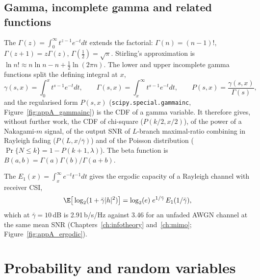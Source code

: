 \subsection{Gamma, incomplete gamma and related functions}

The  $\Gamma(z)=\int_0^\infty t^{z-1}e^{-t}dt$ extends the factorial:
$\Gamma(n)=(n-1)!$, $\Gamma(z+1)=z\Gamma(z)$, $\Gamma(\tfrac12)=\sqrt\pi$. Stirling's
approximation is $\ln n!\approx n\ln n-n+\tfrac12\ln(2\pi n)$. The lower and upper incomplete
gamma functions split the defining integral at $x$,
\begin{equation}
\gamma(s,x)=\int_0^x t^{s-1}e^{-t}dt,\qquad \Gamma(s,x)=\int_x^\infty t^{s-1}e^{-t}dt,\qquad
P(s,x)=\frac{\gamma(s,x)}{\Gamma(s)},
\label{eq:appA:incgamma}
\end{equation}
and the regularised form $P(s,x)$ (\texttt{scipy.special.gammainc}, Figure~\ref{fig:appA_gammainc})
is the CDF of a gamma variable.
It therefore gives, without further work, the CDF of chi-square ($P(k/2,x/2)$), of the power of a
Nakagami-$m$ signal, of the output SNR of $L$-branch maximal-ratio combining in Rayleigh fading
($P(L,x/\bar\gamma)$) and of the Poisson distribution ($\Pr\{N\le k\}=1-P(k+1,\lambda)$). The
beta function is $B(a,b)=\Gamma(a)\Gamma(b)/\Gamma(a+b)$.

The  $E_1(x)=\int_x^\infty e^{-t}t^{-1}dt$ gives the ergodic capacity
of a Rayleigh channel with receiver CSI,
\begin{equation}
\E\big[\log_2(1+\bar\gamma|h|^2)\big]=\log_2(e)\;e^{1/\bar\gamma}\,E_1(1/\bar\gamma),
\label{eq:appA:ergodic}
\end{equation}
which at $\bar\gamma=10$\,dB is 2.91\,b/s/Hz against 3.46 for an unfaded AWGN channel at the same
mean SNR (Chapters~\ref{ch:infotheory} and~\ref{ch:mimo}; Figure~\ref{fig:appA_ergodic}).


\section{Probability and random variables}
\label{sec:appA:probability}

